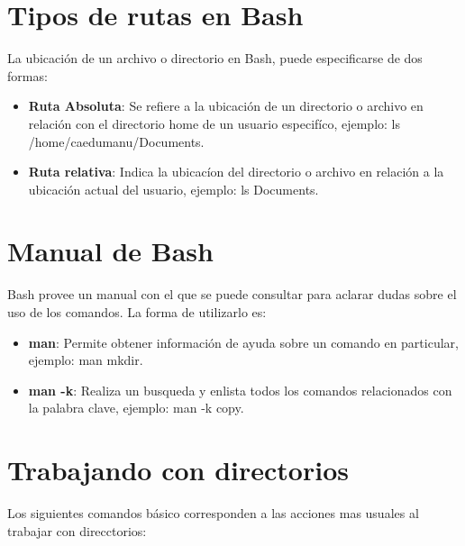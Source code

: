\documentclass[a4paper,12pt]{article}
\begin{document}
\section{Tipos de rutas en Bash}

La ubicación de un archivo o directorio en Bash, puede especificarse de dos formas:

\begin{itemize}
\item{\textbf{Ruta Absoluta}}: Se refiere a la ubicación de un directorio o archivo en relación con el directorio home de un usuario especifíco, ejemplo: ls /home/caedumanu/Documents.
\item{\textbf{Ruta relativa}}: Indica la ubicacíon del directorio o archivo en relación a la ubicación actual del usuario, ejemplo: ls Documents.
\end{itemize}

\section{Manual de Bash}

Bash provee un manual con el que se puede consultar para aclarar dudas sobre el uso de los comandos. La forma de utilizarlo es:

\begin{itemize}
\item{\textbf{man}}: Permite obtener información de ayuda sobre un comando en particular, ejemplo: man mkdir.
\item{\textbf{man -k}}: Realiza un busqueda y enlista todos los comandos relacionados con la palabra clave, ejemplo: man -k copy.
\end{itemize}

\section{Trabajando con directorios}

Los siguientes comandos básico corresponden a las acciones mas usuales al trabajar con direcctorios:
\end{document}
